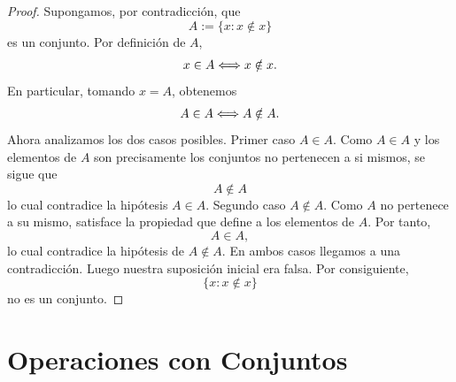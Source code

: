\documentclass[12pt,a4paper]{book}
\begin{document}
    \begin{proof}
        Supongamos, por contradicción, que
        \begin{equation*}
            A:=\{x:x\notin x\}
        \end{equation*}
        es un conjunto. Por definición de $A$,
        \begin{equation*}
            x\in A\Longleftrightarrow x\notin x.
        \end{equation*}
        En particular, tomando $x=A$, obtenemos
        \begin{equation*}
            A\in A\Longleftrightarrow A\notin A.
        \end{equation*}
        Ahora analizamos los dos casos posibles. Primer caso $A\in A$. Como $A\in A$ y los elementos de
        $A$ son precisamente los conjuntos no pertenecen a si mismos, se sigue que
        \begin{equation*}
            A\notin A
        \end{equation*}
        lo cual contradice la hipótesis $A\in A$. Segundo caso $A\notin A$. Como $A$ no pertenece a su mismo,
        satisface la propiedad que define a los elementos de $A$. Por tanto,
        \begin{equation*}
            A\in A,
        \end{equation*}
        lo cual contradice la hipótesis de $A\notin A$. En ambos casos llegamos a una contradicción.
        Luego nuestra suposición inicial era falsa. Por consiguiente,
        \begin{equation*}
            \{x:x\notin x\}
        \end{equation*}
        no es un conjunto.
    \end{proof}

    \vspace{1cm}

    \section{Operaciones con Conjuntos}
\end{document}
